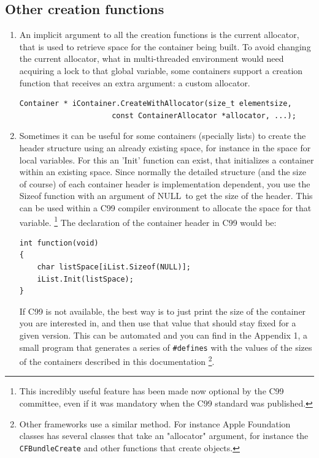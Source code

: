 \documentclass[12pt,a4paper]{memoir} %
\newif\iftth
\newcommand{\Null}{{\iftth \ NULL \else \footnotesize NULL\  \fi}}
\begin{document}
\subsection{Other creation functions}
\begin{enumerate}
\item
An implicit argument to all the creation functions is the current allocator, that is used to retrieve space for the container being built. To avoid changing the current allocator, what in multi-threaded environment would need acquiring a lock to that global variable, some containers support a creation function that receives an extra argument: a custom allocator.
\begin{verbatim}
Container * iContainer.CreateWithAllocator(size_t elementsize,
                     const ContainerAllocator *allocator, ...);
\end{verbatim}
\item
Sometimes it can be useful for some containers (specially lists) to create the  header structure using an already existing space, for instance in the space for local variables. For this an 'Init' function can exist, that initializes a container within an existing space.
Since normally the detailed structure (and the size of course) of each container header is implementation dependent, you use the Sizeof function with an argument of \Null to get the size of the header. This can be used within a C99 compiler environment to allocate the space for that variable.
\footnote{This incredibly useful feature has been made now optional by the C99 committee, even if it was mandatory when the C99 standard was published.}
The declaration of the container header in C99 would be:
\begin{verbatim}
int function(void)
{
    char listSpace[iList.Sizeof(NULL)];
    iList.Init(listSpace);
}
\end{verbatim}
If C99 is not available, the best way is to just print the size of the container you are interested in, and then use that value that should stay fixed 
for a given version. This can be automated and you can find in the Appendix 1, a small program that generates a series of \texttt{\#defines} with the 
values of the sizes of the containers described in this documentation
\footnote{
Other frameworks use a similar method. For instance Apple Foundation classes has several classes that take an "allocator" argument, for instance the
\texttt{CFBundleCreate} and other functions that create objects.
}.


\end{enumerate}
\end{document}
